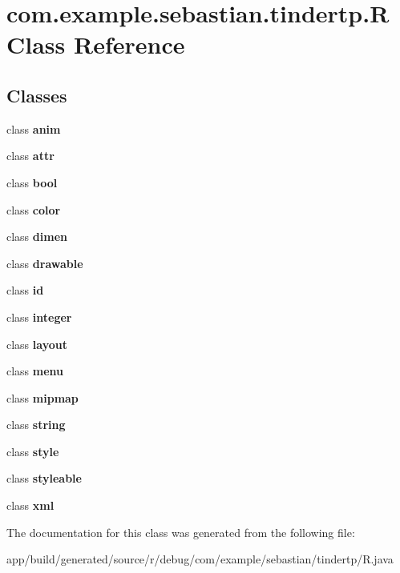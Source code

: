 \hypertarget{classcom_1_1example_1_1sebastian_1_1tindertp_1_1R}{}\section{com.\+example.\+sebastian.\+tindertp.\+R Class Reference}
\label{classcom_1_1example_1_1sebastian_1_1tindertp_1_1R}
\subsection*{Classes}
\begin{DoxyCompactItemize}
\item 
class {\bfseries anim}
\item 
class {\bfseries attr}
\item 
class {\bfseries bool}
\item 
class {\bfseries color}
\item 
class {\bfseries dimen}
\item 
class {\bfseries drawable}
\item 
class {\bfseries id}
\item 
class {\bfseries integer}
\item 
class {\bfseries layout}
\item 
class {\bfseries menu}
\item 
class {\bfseries mipmap}
\item 
class {\bfseries string}
\item 
class {\bfseries style}
\item 
class {\bfseries styleable}
\item 
class {\bfseries xml}
\end{DoxyCompactItemize}


The documentation for this class was generated from the following file\+:\begin{DoxyCompactItemize}
\item 
app/build/generated/source/r/debug/com/example/sebastian/tindertp/R.\+java\end{DoxyCompactItemize}
